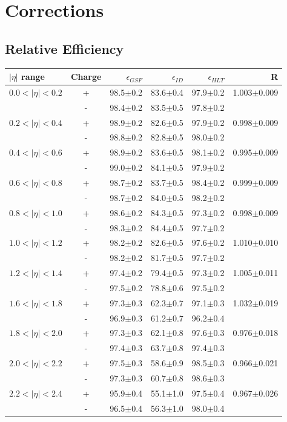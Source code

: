 \section{Corrections}
\subsection{Relative Efficiency}


\begin{table}[htb]
\begin{center}
\begin{tabular}{lcrrrr}
$|\eta|$ range & Charge & $\epsilon_{GSF}$ &$\epsilon_{ID}$&$\epsilon_{HLT}$& R\\
\hline
$0.0<| \eta |<0.2$ &+& 98.5$\pm$0.2 &83.6$\pm$0.4 &97.9$\pm$0.2 &1.003$\pm$0.009\\
                   &-& 98.4$\pm$0.2 &83.5$\pm$0.5 &97.8$\pm$0.2 & \\
$0.2<| \eta |<0.4$ &+& 98.9$\pm$0.2 &82.6$\pm$0.5 &97.9$\pm$0.2 & 0.998$\pm$0.009\\
                   &-& 98.8$\pm$0.2 &82.8$\pm$0.5 &98.0$\pm$0.2 & \\
$0.4<| \eta |<0.6$ &+& 98.9$\pm$0.2&83.6$\pm$0.5 &98.1$\pm$0.2 & 0.995$\pm$0.009\\
                   &-& 99.0$\pm$0.2 &84.1$\pm$0.5 &97.9$\pm$0.2 & \\
$0.6<| \eta |<0.8$ &+& 98.7$\pm$0.2 &83.7$\pm$0.5 &98.4$\pm$0.2 & 0.999$\pm$0.009\\
                   &-& 98.7$\pm$0.2 &84.0$\pm$0.5&98.2$\pm$0.2 & \\
$0.8<| \eta |<1.0$ &+& 98.6$\pm$0.2 &84.3$\pm$0.5 &97.3$\pm$0.2 & 0.998$\pm$0.009\\
                   &-& 98.3$\pm$0.2 &84.4$\pm$0.5 &97.7$\pm$0.2 & \\
$1.0<| \eta |<1.2$ &+& 98.2$\pm$0.2 &82.6$\pm$0.5 &97.6$\pm$0.2 & 1.010$\pm$0.010\\
                   &-& 98.2$\pm$0.2 &81.7$\pm$0.5 &97.7$\pm$0.2 & \\
$1.2<| \eta |<1.4$ &+& 97.4$\pm$0.2 &79.4$\pm$0.5 &97.3$\pm$0.2 & 1.005$\pm$0.011\\
                   &-& 97.5$\pm$0.2 &78.8$\pm$0.6 &97.5$\pm$0.2 & \\
$1.6<| \eta |<1.8$ &+& 97.3$\pm$0.3 &62.3$\pm$0.7 &97.1$\pm$0.3 & 1.032$\pm$0.019\\
                   &-& 96.9$\pm$0.3 &61.2$\pm$0.7 &96.2$\pm$0.4 & \\
$1.8<| \eta |<2.0$ &+& 97.3$\pm$0.3 &62.1$\pm$0.8 &97.6$\pm$0.3 & 0.976$\pm$0.018\\
                   &-& 97.4$\pm$0.3 &63.7$\pm$0.8 &97.4$\pm$0.3 & \\
$2.0<| \eta |<2.2$ &+& 97.5$\pm$0.3 &58.6$\pm$0.9 &98.5$\pm$0.3 & 0.966$\pm$0.021\\
                   &-& 97.3$\pm$0.3 &60.7$\pm$0.8 &98.6$\pm$0.3 & \\
$2.2<| \eta |<2.4$ &+& 95.9$\pm$0.4 &55.1$\pm$1.0 &97.5$\pm$0.4 & 0.967$\pm$0.026\\
                   &-& 96.5$\pm$0.4 &56.3$\pm$1.0 &98.0$\pm$0.4 & \\


\end{tabular}
\end{center}
\end{table}
